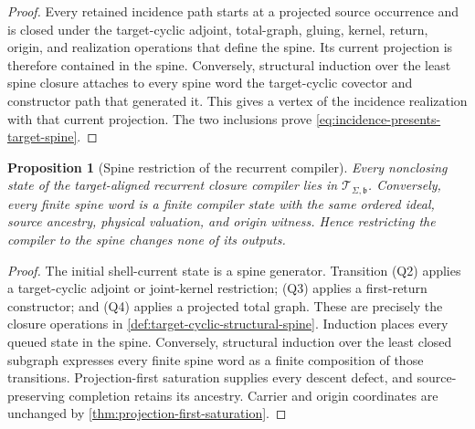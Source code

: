 \documentclass[11pt]{article}
\numberwithin{section}{part}
\theoremstyle{plain}
\newtheorem{proposition}[proposition]{Proposition}
\theoremstyle{definition}
\theoremstyle{remark}
\newcommand{\Spine}{\mathscr T}
\begin{document}
\begin{proof}
Every retained incidence path starts at a projected source occurrence and is
closed under the target-cyclic adjoint, total-graph, gluing, kernel, return,
origin, and realization operations that define the spine.  Its current
projection is therefore contained in the spine.  Conversely, structural
induction over the least spine closure attaches to every spine word the
target-cyclic covector and constructor path that generated it.  This gives a
vertex of the incidence realization with that current projection.  The two
inclusions prove \eqref{eq:incidence-presents-target-spine}.
\end{proof}

\begin{proposition}[Spine restriction of the recurrent compiler]
\label{prop:spine-restriction-recurrent-compiler}
Every nonclosing state of the target-aligned recurrent closure compiler lies
in \(\Spine_{\Sigma,\mathfrak b}\).  Conversely, every finite spine word is a
finite compiler state with the same ordered ideal, source ancestry, physical
valuation, and origin witness.  Hence restricting the compiler to the spine
changes none of its outputs.
\end{proposition}

\begin{proof}
The initial shell-current state is a spine generator.  Transition
\textup{(Q2)} applies a target-cyclic adjoint or joint-kernel restriction;
\textup{(Q3)} applies a first-return constructor; and \textup{(Q4)} applies a
projected total graph.  These are precisely the closure operations in
\cref{def:target-cyclic-structural-spine}.  Induction places every queued
state in the spine.  Conversely, structural induction over the least closed
subgraph expresses every finite spine word as a finite composition of those
transitions.  Projection-first saturation supplies every descent defect, and
source-preserving completion retains its ancestry.  Carrier and origin
coordinates are unchanged by \cref{thm:projection-first-saturation}.
\end{proof}
\end{document}
